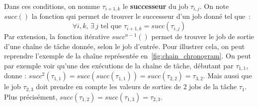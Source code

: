 \documentclass[french, a4paper, 11pt, twoside, pdftex]{StyleThese}
\begin{document}
		Dans ces conditions, on nomme $\tau_{i+1,k}$ le \textbf{successeur} du job $\tau_{i,j}$. On note $succ()$ la fonction qui permet de trouver le successeur d'un job donné tel que~: 
		\begin{equation*}
		\forall i,k, \, \exists \, j  \textrm{ tel que }  \tau_{i+1,k} = succ(\tau_{i,j})
		\end{equation*}
		Par extension, la fonction itérative $succ^{n-1}()$ permet de trouver le job de sortie d'une chaîne de tâche donnée, selon le job d'entrée. 
	    Pour illustrer cela, on peut reprendre l'exemple de la chaîne représentée en~\autoref{fig:chain_chronogram}. On peut par exemple voir qu'une des exécutions de la chaîne de tâche, débutant par $\tau_{1,1}$, donne : $succ^{2}(\tau_{1,1}) = succ(succ(\tau_{1,1})) = succ(\tau_{2,2}) = \tau_{3,2}$. Mais aussi que le job $ \tau_{2,3} $ doit prendre en compte les valeurs de sorties de 2 jobs de la tâche $ \tau_1 $. Plus précisément, $succ(\tau_{1,2}) = succ(\tau_{1,3}) = \tau_{2,3} $. %
	    
\end{document}

